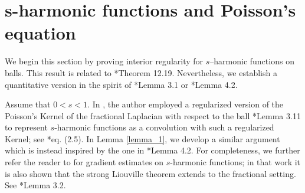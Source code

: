 \documentclass[letterpaper, 11pt,  reqno]{amsart}
\theoremstyle{definition}
\theoremstyle{remark}
\numberwithin{equation}{section}
\begin{document}
	
\section{s-harmonic functions and Poisson's equation}\label{sec3}
We begin this section by proving interior regularity for $s$--harmonic functions on balls. This result is related to \cite{garofalo}*{Theorem 12.19}.  Nevertheless, we establish a quantitative version in the spirit of \cite{entire}*{Lemma 3.1} or \cite{orbital}*{Lemma 4.2}. 

Assume that  $0<s<1$. In \cite{entire}, the author employed a regularized version of the Poisson's  Kernel of the fractional Laplacian with respect to the ball  \cite{BBK}*{Lemma 3.11} to represent $s$-harmonic functions as a convolution with such a regularized Kernel; see \cite{entire}*{eq. (2.5)}. In Lemma \ref{lemma_1}, we develop a similar argument which is instead inspired by the one in \cite{orbital}*{Lemma 4.2}. For completeness, we further refer the reader to \cite{BBK2} for gradient estimates on $s$-harmonic functions; in that work it is also shown that the strong Liouville theorem extends to the fractional setting. See  \cite{BBK2}*{Lemma 3.2}.
	
\end{document}
